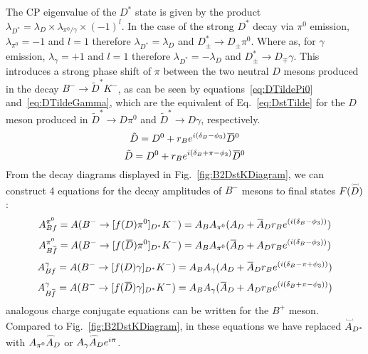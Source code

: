 \documentclass[oneside,12pt]{article}
\newcommand{\overbar}[1]{\mkern 1.5mu\overline{\mkern-1.5mu#1\mkern-1.5mu}\mkern 1.5mu}
\newcommand\brobor{\smash[b]{\raisebox{0.6\height}{\scalebox{0.5}{\tiny(}}{\mkern-1.5mu\scriptstyle-\mkern-1.5mu}\raisebox{0.6\height}{\scalebox{0.5}{\tiny)}}}}
\begin{document}
The CP eigenvalue of the $D^*$ state is given by the product $\lambda_{D^*}=\lambda_D\times \lambda_{\pi^0\text{/}\gamma} \times(-1)^l$. In the case of the strong $D^*$ decay via $\pi^0$ emission, $\lambda_{\pi^0}=-1$ and $l=1$ therefore $\lambda_{D^*}=\lambda_D$ and $D^*_{\pm}\rightarrow D_{\pm}\pi^0$. Where as, for $\gamma$ emission, $\lambda_{\gamma}=+1$ and $l=1$ therefore $\lambda_{D^*}=-\lambda_D$ and $D^*_{\pm}\rightarrow D_{\mp}\gamma$. This introduces a
  strong phase shift of $\pi$ between the two neutral $D$ mesons produced in the decay $B^-\rightarrow \tilde{D}^*K^-$, as can be seen by equations~\eqref{eq:DTildePi0} and~\eqref{eq:DTildeGamma}, which are the equivalent of Eq.~\eqref{eq:DstTilde} for the $D$ meson produced in $\tilde{D}^*\rightarrow D\pi^0$ and $\tilde{D}^*\rightarrow D\gamma$, respectively.
  \begin{equation}
    \tilde{D}=D^0+r_Be^{i(\delta_B-\phi_3)}\overbar{D}^0
    \label{eq:DTildePi0}
  \end{equation}
  \begin{equation}
    \tilde{D}=D^0+r_Be^{i(\delta_B+\pi-\phi_3)}\overbar{D}^0
    \label{eq:DTildeGamma}
  \end{equation}
\noindent From the decay diagrams displayed in Fig.~\ref{fig:B2DstKDiagram}, we can construct 4 equations for the decay amplitudes of $B^{-}$ mesons to final states $F(\accentset{\brobor}{D}\phantom{})$:
  \begin{equation}
    A_{Bf}^{\pi^{0}}=A(B^{-}\rightarrow [f(D)\pi^{0}]_{D^{*}}K^{-})=A_{B}A_{\pi^{0}}(A_{D}+\overbar{A}_{D}r_{B}e^{(i(\delta_{B}-\phi_{3}))})
    \label{eq:A(Bf)pi0}
  \end{equation}
  \begin{equation}
    A_{B\overbar{f}}^{\pi^{0}}=A(B^{-}\rightarrow [f(\overbar{D})\pi^{0}]_{D^{*}}K^{-})=A_{B}A_{\pi^{0}}(\overbar{A}_{D}+A_{D}r_{B}e^{(i(\delta_{B}-\phi_{3}))})
    \label{eq:A(Bfbar)pi0}
  \end{equation}
  \begin{equation}
    A_{Bf}^{\gamma}=A(B^{-}\rightarrow [f(D)\gamma]_{D^{*}}K^{-})=A_{B}A_{\gamma}(A_{D}+\overbar{A}_{D}r_{B}e^{(i(\delta_{B}-\pi+\phi_{3}))})
    \label{eq:A(Bf)gamma}
  \end{equation}
  \begin{equation}
    A_{B\overbar{f}}^{\gamma}=A(B^{-}\rightarrow [f(\overbar{D})\gamma]_{D^{*}}K^{-})=A_{B}A_{\gamma}(\overbar{A}_{D}+A_{D}r_{B}e^{(i(\delta_{B}+\pi-\phi_{3}))})
    \label{eq:A(Bfbar)gamma}
  \end{equation}
 analogous charge conjugate equations can be written for the $B^{+}$ meson. Compared to Fig.~\ref{fig:B2DstKDiagram}, in these equations we have replaced $\accentset{\brobor}{A}\phantom{}_{D^{*}}$ with $A_{\pi^{0}}\accentset{\brobor}{A}\phantom{}_{D}$ or $A_{\gamma}\accentset{\brobor}{A}\phantom{}_{D}e^{{i\pi}}$. 
\end{document}
